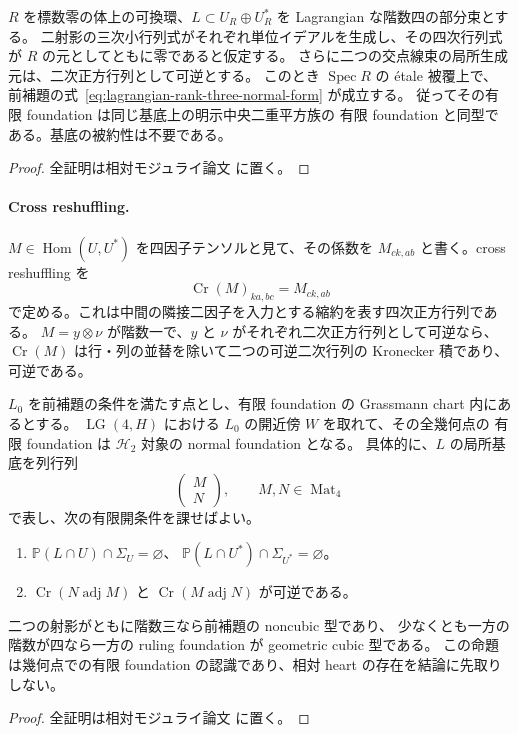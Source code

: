 \begin{proposition}[非被約閉基底上の両階数三正規形]
\label{prop:lagrangian-relative-double-rank-three}
$R$ を標数零の体上の可換環、$L\subset U_R\oplus U_R^*$ を
Lagrangian な階数四の部分束とする。
二射影の三次小行列式がそれぞれ単位イデアルを生成し、その四次行列式が
$R$ の元としてともに零であると仮定する。
さらに二つの交点線束の局所生成元は、二次正方行列として可逆とする。
このとき $\operatorname{Spec}R$ の \texorpdfstring{\'etale}{etale} 被覆上で、
前補題の式~\eqref{eq:lagrangian-rank-three-normal-form} が成立する。
従ってその有限 foundation は同じ基底上の明示中央二重平方族の
有限 foundation と同型である。基底の被約性は不要である。
\end{proposition}
\begin{proof}
全証明は相対モジュライ論文 \cite[noncubic有限型効果性]{QuadricModuli2026} に置く。
\end{proof}

\paragraph{Cross reshuffling.}
$M\in\operatorname{Hom}(U,U^*)$ を四因子テンソルと見て、その係数を
$M_{ck,ab}$ と書く。cross reshuffling を
\[
 \operatorname{Cr}(M)_{ka,bc}=M_{ck,ab}
\]
で定める。これは中間の隣接二因子を入力とする縮約を表す四次正方行列である。
$M=y\otimes\nu$ が階数一で、$y$ と $\nu$ がそれぞれ二次正方行列として可逆なら、
$\operatorname{Cr}(M)$ は行・列の並替を除いて二つの可逆二次行列の Kronecker 積であり、可逆である。

\begin{proposition}
\label{prop:lagrangian-geometric-recognition-open}
$L_0$ を前補題の条件を満たす点とし、有限 foundation の Grassmann chart 内にあるとする。
$\operatorname{LG}(4,H)$ における $L_0$ の開近傍 $W$ を取れて、その全幾何点の
有限 foundation は $\mathcal H_2$ 対象の normal foundation となる。
具体的に、$L$ の局所基底を列行列
\[
 \begin{pmatrix}M\\N\end{pmatrix},\qquad M,N\in\operatorname{Mat}_4
\]
で表し、次の有限開条件を課せばよい。
\begin{enumerate}
\item $\mathbb P(L\cap U)\cap\Sigma_U=\varnothing$、
      $\mathbb P(L\cap U^*)\cap\Sigma_{U^*}=\varnothing$。
\item $\operatorname{Cr}(N\operatorname{adj}M)$ と
      $\operatorname{Cr}(M\operatorname{adj}N)$ が可逆である。
\end{enumerate}
二つの射影がともに階数三なら前補題の noncubic 型であり、
少なくとも一方の階数が四なら一方の ruling foundation が geometric cubic 型である。
この命題は幾何点での有限 foundation の認識であり、相対 heart の存在を結論に先取りしない。
\end{proposition}
\begin{proof}
全証明は相対モジュライ論文 \cite[noncubic有限型効果性]{QuadricModuli2026} に置く。
\end{proof}

